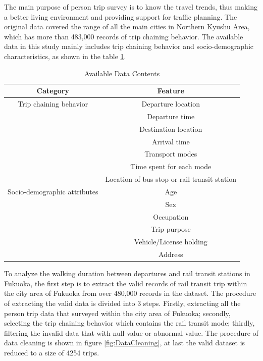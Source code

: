 \documentclass[sustainability,article,submit,moreauthors,pdftex,10pt,a4paper]{Definitions/mdpi}
\begin{document}
%
The main purpose of person trip survey is to know the travel trends, thus making a better living environment and providing support for traffic planning. The original data covered the range of all the main cities in Northern Kyushu Area, which has more than 483,000 records of trip chaining behavior. The available data in this study mainly includes trip chaining behavior and socio-demographic characteristics, as shown in the table \ref{table:AvailableData}.

%
\begin{table}[h]
	\centering
	\caption{Available Data Contents}
	\label{table:AvailableData}
	\begin{tabular}{cc}
		\toprule
		Category & Feature\\
		\midrule
		Trip chaining behavior & Departure location \\
		& Departure time \\
		& Destination location \\
		& Arrival time \\
		& Transport modes \\
		& Time spent for each mode \\
		& Location of bus stop or rail transit station \\
		\midrule
		Socio-demographic attributes & Age \\
		& Sex \\
		& Occupation \\
		& Trip purpose \\
		& Vehicle/License holding \\
		& Address \\
		\bottomrule
	\end{tabular}
	\normalsize
\end{table}

%
To analyze the walking duration between departures and rail transit stations in Fukuoka, the first step is to extract the valid records of rail transit trip within the city area of Fukuoka from over 480,000 records in the dataset. The procedure of extracting the valid data is divided into 3 steps. Firstly, extracting all the person trip data that surveyed within the city area of Fukuoka; secondly, selecting the trip chaining behavior which contains the rail transit mode; thirdly, filtering the invalid data that with null value or abnormal value. The procedure of data cleaning is shown in figure \ref{fig:DataCleaning}, at last the valid dataset is reduced to a size of 4254 trips.
\end{document}
